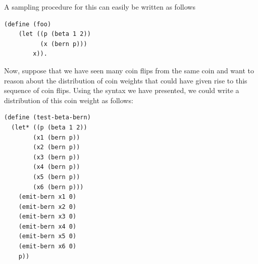 \documentclass{article}
\begin{document}
A sampling procedure for this can easily be written as follows 
\begin{verbatim}
(define (foo)
    (let ((p (beta 1 2))
          (x (bern p)))
        x)).
\end{verbatim}

Now, suppose that we have seen many coin flips from the same coin and want to
reason about the distribution of coin weights that could have given rise to
this sequence of coin flips. Using the syntax we have presented, we could write
a distribution of this coin weight as follows:
\begin{verbatim}
(define (test-beta-bern)
  (let* ((p (beta 1 2))
        (x1 (bern p))
        (x2 (bern p))
        (x3 (bern p))
        (x4 (bern p))
        (x5 (bern p))
        (x6 (bern p)))
    (emit-bern x1 0)
    (emit-bern x2 0)
    (emit-bern x3 0)
    (emit-bern x4 0)
    (emit-bern x5 0)
    (emit-bern x6 0)
    p))
\end{verbatim}






\end{document}
